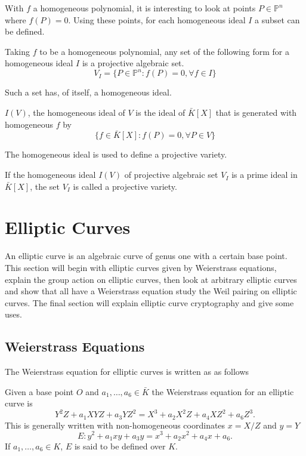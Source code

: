 With $f$ a homogeneous polynomial, it is interesting to look at points $P\in\mathbb{P}^n$ where $f(P)=0$. Using these points, for each homogeneous ideal $I$ a subset can be defined.
\begin{defn}
	Taking $f$ to be a homogeneous polynomial, any set of the following form for a homogeneous ideal $I$ is a projective algebraic set.
	\begin{equation*}
	V_I=\{P\in\mathbb{P}^n:f(P)=0,\forall f\in I\}
	\end{equation*}
\end{defn}

Such a set has, of itself, a homogeneous ideal.
\begin{defn}
	$I(V)$, the homogeneous ideal of $V$ is the ideal of $\bar{K}[X]$ that is generated with homogeneous $f$ by
	\begin{equation*}
	\{f\in\bar{K}[X]:f(P)=0,\forall P\in V\}
	\end{equation*}
\end{defn}

The homogeneous ideal is used to define a projective variety.
\begin{defn}
	If the homogeneous ideal $I(V)$ of projective algebraic set $V_I$ is a prime ideal in $\bar{K}[X]$, the set $V_I$ is called a projective variety.
\end{defn}
\section{Elliptic Curves}
An elliptic curve is an algebraic curve of genus one with a certain base point. This section will begin with elliptic curves given by Weierstrass equations, explain the group action on elliptic curves, then look at arbitrary elliptic curves and show that all have a Weierstrass equation study the Weil pairing on elliptic curves. The final section will explain elliptic curve cryptography and give some uses.
\subsection{Weierstrass Equations}
The Weierstrass equation for elliptic curves is written as as follows
\begin{defn}
	Given a base point $O$ and $a_1,\dots,a_6\in\bar{K}$ the Weierstrass equation for an elliptic curve is
	\begin{equation*}
	Y^2Z+a_1XYZ+a_3YZ^2=X^3+a_2X^2Z+a_4XZ^2+a_6Z^3.
	\end{equation*}
	This is generally written with non-homogeneous coordinates $x=X/Z$ and $y=Y$
	\begin{equation*}
	E:y^2+a_1xy+a_3y=x^3+a_2x^2+a_4x+a_6.
	\end{equation*}
	If $a_1,\dots,a_6\in K$, $E$ is said to be defined over $K$.
\end{defn}

